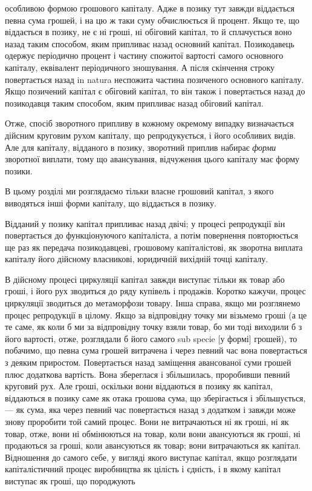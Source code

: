 \parcont{}  %
особливою формою грошового капіталу. Адже в позику тут
завжди віддається певна сума грошей, і на цю ж таки суму обчислюється
й процент. Якщо те, що віддається в позику, не є ні
гроші, ні обіговий капітал, то й сплачується воно назад таким
способом, яким припливає назад основний капітал. Позикодавець
одержує періодично процент і частину спожитої вартості самого
основного капіталу, еквівалент періодичного зношування.
А після скінчення строку повертається назад in natura неспожита
частина позиченого основного капіталу. Якщо позичений
капітал є обіговий капітал, то він також і повертається назад
до позикодавця таким способом, яким припливає назад обіговий
капітал.

Отже, спосіб зворотного припливу в кожному окремому випадку
визначається дійсним круговим рухом капіталу, що репродукується,
і його особливих видів. Але для капіталу, відданого
в позику, зворотний приплив набирає \emph{форми} зворотної виплати,
тому що авансування, відчуження цього капіталу має
форму позики.

В цьому розділі ми розглядаємо тільки власне грошовий капітал,
з якого виводяться інші форми капіталу, що віддається
в позику.

Відданий у позику капітал припливає назад двічі; у процесі
репродукції він повертається до функціонуючого капіталіста, а
потім повернення повторюється ще раз як передача позикодавцеві,
грошовому капіталістові, як зворотна виплата капіталу
його дійсному власникові, юридичній вихідній точці капіталу.

В дійсному процесі циркуляції капітал завжди виступає тільки
як товар або гроші, і його рух зводиться до ряду купівель і
продажів. Коротко кажучи, процес циркуляції зводиться до метаморфози
товару. Інша справа, якщо ми розглянемо процес репродукції
в цілому. Якщо за відпровідну точку ми візьмемо гроші
(а це те саме, як коли б ми за відпровідну точку взяли товар, бо ми
тоді виходили б з його вартості, отже, розглядали б його самого
sub specie [у формі] грошей), то побачимо, що певна сума
грошей витрачена і через певний час вона повертається з деяким
приростом. Повертається назад заміщення авансованої
суми грошей плюс додаткова вартість. Вона збереглася і збільшилась,
проробивши певний круговий рух. Але гроші, оскільки
вони віддаються в позику як капітал, віддаються в позику саме
як отака грошова сума, що зберігається і збільшується, — як
сума, яка через певний час повертається назад з додатком
і завжди може знову проробити той самий процес. Вони не витрачаються
ні як гроші, ні як товар, отже, вони ні обмінюються
на товар, коли вони авансуються як гроші, ні продаються за
гроші, коли авансуються як товар; вони витрачаються як капітал.
Відношення до самого себе, у вигляді якого виступає капітал,
якщо розглядати капіталістичний процес виробництва як цілість
і єдність, і в якому капітал виступає як гроші, що породжують
\parbreak{}  %
